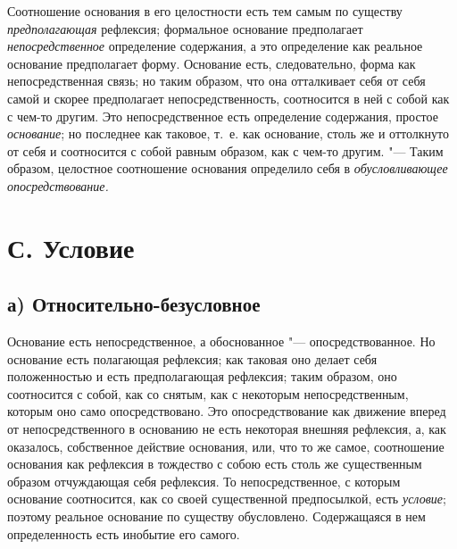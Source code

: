 Соотношение основания в его целостности есть тем самым по существу
{\em предполагающая} рефлексия; формальное основание
предполагает {\em непосредственное} определение
содержания, а это определение как реальное основание предполагает форму.
Основание есть, следовательно, форма как непосредственная связь; но таким
образом, что она отталкивает себя от себя самой и скорее предполагает
непосредственность, соотносится в ней с собой как с чем-то другим. Это
непосредственное есть определение содержания, простое
{\em основание}; но последнее как таковое, т.~е. как
основание, столь же и оттолкнуто от себя и соотносится с собой равным
образом, как с чем-то другим. "--- Таким образом, целостное соотношение
основания определило себя в {\em обусловливающее опосредствование.}


\section[С. Условие]{С. Условие}
\subsection[а) Относительно-безусловное]{а) Относительно-безусловное}

Основание есть непосредственное, а обоснованное
"--- опосредствованное. Но основание есть полагающая рефлексия; как таковая
оно делает себя положенностью и есть предполагающая рефлексия; таким
образом, оно соотносится с собой, как со снятым, как с некоторым
непосредственным, которым оно само опосредствовано. Это опосредствование
как движение вперед от непосредственного в основанию не есть некоторая
внешняя рефлексия, а, как оказалось, собственное действие основания, или,
что то же самое, соотношение основания как рефлексия в тождество с собою
есть столь же существенным образом отчуждающая себя рефлексия. То
непосредственное, с которым основание соотносится, как со своей
существенной предпосылкой, есть {\em условие}; поэтому
реальное основание по существу обусловлено. Содержащаяся в нем
определенность есть инобытие его самого.

